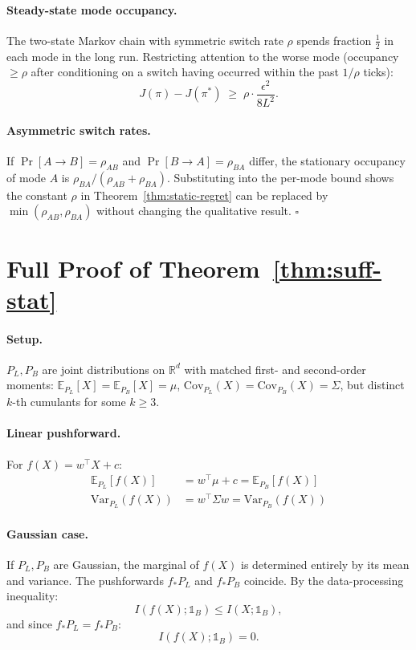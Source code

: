 \paragraph{Steady-state mode occupancy.} The two-state Markov chain
with symmetric switch rate $\rho$ spends fraction $\tfrac{1}{2}$ in each
mode in the long run. Restricting attention to the worse mode
(occupancy $\ge \rho$ after conditioning on a switch having occurred
within the past $1/\rho$ ticks):
\begin{equation}
  J(\pi) - J(\pi^*) \;\ge\; \rho \cdot \frac{\epsilon^2}{8L^2}.
\end{equation}

\paragraph{Asymmetric switch rates.} If $\Pr[A \to B] = \rho_{AB}$ and
$\Pr[B \to A] = \rho_{BA}$ differ, the stationary occupancy of mode $A$
is $\rho_{BA} / (\rho_{AB} + \rho_{BA})$. Substituting into the per-mode
bound shows the constant $\rho$ in Theorem~\ref{thm:static-regret} can
be replaced by $\min(\rho_{AB}, \rho_{BA})$ without changing the
qualitative result. $\square$

\section{Full Proof of Theorem~\ref{thm:suff-stat}}
\label{app:suff-stat-full}

\paragraph{Setup.} $P_L, P_B$ are joint distributions on $\mathbb{R}^d$
with matched first- and second-order moments:
$\mathbb{E}_{P_L}[X] = \mathbb{E}_{P_B}[X] = \mu$,
$\mathrm{Cov}_{P_L}(X) = \mathrm{Cov}_{P_B}(X) = \Sigma$,
but distinct $k$-th cumulants for some $k \ge 3$.

\paragraph{Linear pushforward.} For $f(X) = w^\top X + c$:
\begin{align}
  \mathbb{E}_{P_L}[f(X)] &= w^\top \mu + c = \mathbb{E}_{P_B}[f(X)] \\
  \mathrm{Var}_{P_L}(f(X)) &= w^\top \Sigma w = \mathrm{Var}_{P_B}(f(X))
\end{align}

\paragraph{Gaussian case.} If $P_L, P_B$ are Gaussian, the marginal of
$f(X)$ is determined entirely by its mean and variance. The
pushforwards $f_\ast P_L$ and $f_\ast P_B$ coincide. By the
data-processing inequality:
\begin{equation}
  I(f(X); \mathbb{1}_B) \le I(X; \mathbb{1}_B),
\end{equation}
and since $f_\ast P_L = f_\ast P_B$:
\begin{equation}
  I(f(X); \mathbb{1}_B) = 0.
\end{equation}

